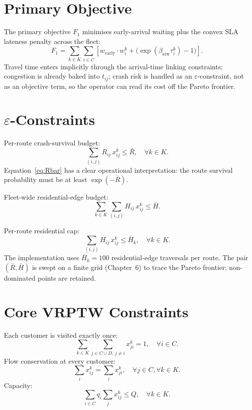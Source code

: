 \section{Primary Objective}

The primary objective $F_1$ minimises early-arrival waiting plus the
convex SLA lateness penalty across the fleet:
\begin{equation}
    F_1 = \sum_{k \in K} \sum_{i \in C}
    \left[ w_{\text{early}} \cdot w_i^k +
    \big(\exp(\beta_{\text{stw}} \tau_i^k) - 1\big) \right].
    \label{eq:F1}
\end{equation}
Travel time enters implicitly through the arrival-time linking
constraints; congestion is already baked into $t_{ij}$; crash risk is
handled as an $\varepsilon$-constraint, not as an objective term, so
the operator can read its cost off the Pareto frontier.

\section{$\varepsilon$-Constraints}
\label{ch3:eps}

Per-route crash-survival budget:
\begin{equation}
    \sum_{(i,j)} R_{ij} \, x_{ij}^k \leq \bar{R}, \quad \forall k \in K.
    \label{eq:Rbar}
\end{equation}
Equation~\eqref{eq:Rbar} has a clear operational interpretation: the
route survival probability must be at least $\exp(-\bar{R})$.

Fleet-wide residential-edge budget:
\begin{equation}
    \sum_{k \in K} \sum_{(i,j)} H_{ij} \, x_{ij}^k \leq \bar{H}.
    \label{eq:Hbar}
\end{equation}

Per-route residential cap:
\begin{equation}
    \sum_{(i,j)} H_{ij} \, x_{ij}^k \leq \bar{H}_k, \quad \forall k \in K.
    \label{eq:Hk}
\end{equation}
The implementation uses $\bar{H}_k = 100$ residential-edge
traversals per route. The pair $(\bar{R}, \bar{H})$ is swept on a
finite grid (Chapter~6) to trace the Pareto frontier; non-dominated
points are retained.

\section{Core VRPTW Constraints}

Each customer is visited exactly once:
\begin{equation}
    \sum_{k \in K} \sum_{j \in C \cup D,\, j \neq i} x_{ji}^k = 1,
    \quad \forall i \in C. \label{eq:visit}
\end{equation}
Flow conservation at every customer:
\begin{equation}
    \sum_{i} x_{ij}^k = \sum_{i} x_{ji}^k, \quad \forall j \in C, \forall k \in K. \label{eq:flow}
\end{equation}
Capacity:
\begin{equation}
    \sum_{i \in C} q_i \sum_{j} x_{ij}^k \leq Q, \quad \forall k \in K. \label{eq:cap}
\end{equation}

